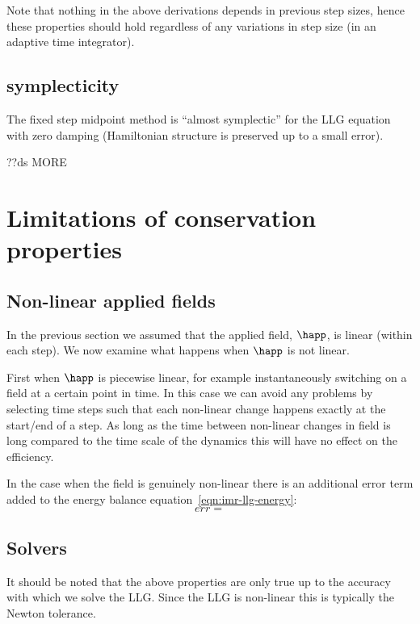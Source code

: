 Note that nothing in the above derivations depends in previous step sizes, hence these properties should hold regardless of any variations in step size (\ie in an adaptive time integrator).


\subsection{symplecticity}
\label{sec:symplecticity-imr-llg}


The fixed step midpoint method is ``almost symplectic'' for the LLG equation with zero damping (Hamiltonian structure is preserved up to a small error).\cite{Austin1993}

??ds MORE


\section{Limitations of conservation properties}

\subsection{Non-linear applied fields}
\label{sec:non-linear-applied}

In the previous section we assumed that the applied field, $\happ$, is linear (within each step).
We now examine what happens when $\happ$ is not linear.

First when $\happ$ is piecewise linear, for example instantaneously switching on a field at a certain point in time.
In this case we can avoid any problems by selecting time steps such that each non-linear change happens exactly at the start/end of a step.
As long as the time between non-linear changes in field is long compared to the time scale of the dynamics this will have no effect on the efficiency.

In the case when the field is genuinely non-linear there is an additional error term added to the energy balance equation~\eqref{eqn:imr-llg-energy}:
\begin{equation}
  err =
\end{equation}






\subsection{Solvers}

It should be noted that the above properties are only true up to the accuracy with which we solve the LLG. Since the LLG is non-linear this is typically the Newton tolerance.


